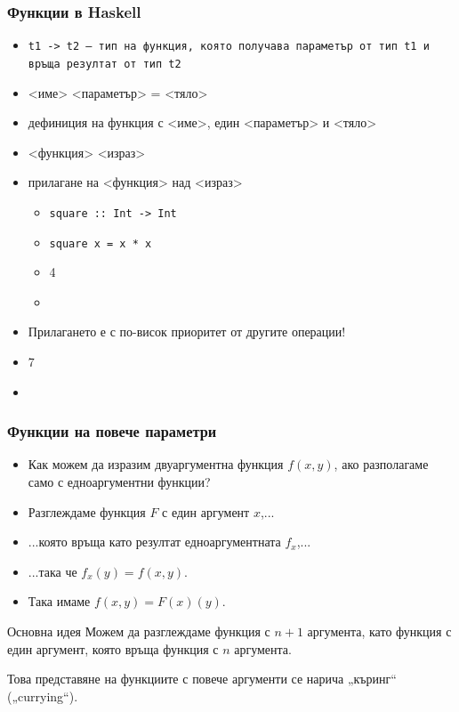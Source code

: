 \documentclass[alsotrans,beameroptions={aspectratio=169}]{beamerswitch}
\begin{document}
\begin{frame}
  \frametitle{Функции в Haskell}

  \begin{itemize}[<+->]
  \item \tt{t1 -> t2} --- тип на функция, която получава параметър от тип \tt{t1} и връща резултат от тип \tt{t2}
  \item {}<име> <параметър> \tta= <тяло>
  \item дефиниция на функция с <име>, един <параметър> и <тяло>
  \item {}<функция> <израз>
  \item прилагане на <функция> над <израз>
    \begin{itemize}[<.->]
    \item \tt{square :: Int -> Int}
    \item \tt{square x = x * x}
    \item {}4
    \item {}
    \end{itemize}
  \item \alert{Прилагането е с по-висок приоритет от другите операции!}
  \item {}7
  \item {}
  \end{itemize}
\end{frame}

\begin{frame}
  \frametitle{Функции на повече параметри}
  \begin{itemize}[<+->]
  \item Как можем да изразим двуаргументна функция $f(x,y)$, ако разполагаме само с едноаргументни функции?
  \item Разглеждаме функция $F$ с един аргумент $x$,...
  \item ...която връща като резултат едноаргументната $f_x$,...
  \item ...така че $f_x(y) = f(x,y)$.
  \item Така имаме $f(x,y) = F(x)(y)$.
  \end{itemize}
  \onslide<+->
  \begin{block}{Основна идея}
    Можем да разглеждаме функция с $n+1$ аргумента, като функция с един аргумент, която връща функция с $n$ аргумента.
  \end{block}
  \onslide<+->
  \alert{Това представяне на функциите с повече аргументи се нарича „къринг“ („currying“).}
\end{frame}
\end{document}
